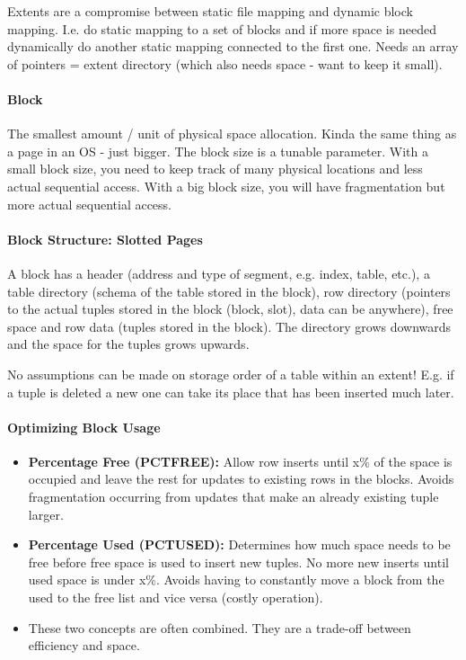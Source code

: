 Extents are a compromise between static file mapping and dynamic block mapping. I.e. do static mapping to a set of blocks and if more space is needed dynamically do another static mapping connected to the first one. Needs an array of pointers = extent directory (which also needs space - want to keep it small).

\paragraph{Block}
The smallest amount / unit of physical space allocation. Kinda the same thing as a page in an OS - just bigger. The block size is a tunable parameter. With a small block size, you need to keep track of many physical locations and less actual sequential access. With a big block size, you will have fragmentation but more actual sequential access.

\paragraph{Block Structure: Slotted Pages}
A block has a header (address and type of segment, e.g. index, table, etc.), a table directory (schema of the table stored in the block), row directory (pointers to the actual tuples stored in the block (block, slot), data can be anywhere), free space and row data (tuples stored in the block). The directory grows downwards and the space for the tuples grows upwards.

No assumptions can be made on storage order of a table within an extent! E.g. if a tuple is deleted a new one can take its place that has been inserted much later.

\paragraph{Optimizing Block Usage}
\begin{itemize}
    \item \textbf{Percentage Free (PCTFREE):} Allow row inserts until x\% of the space is occupied and leave the rest for updates to existing rows in the blocks. Avoids fragmentation occurring from updates that make an already existing tuple larger. 
    \item \textbf{Percentage Used (PCTUSED):} Determines how much space needs to be free before free space is used to insert new tuples. No more new inserts until used space is under x\%. Avoids having to constantly move a block from the used to the free list and vice versa (costly operation).
    \item These two concepts are often combined. They are a trade-off between efficiency and space.
\end{itemize}

